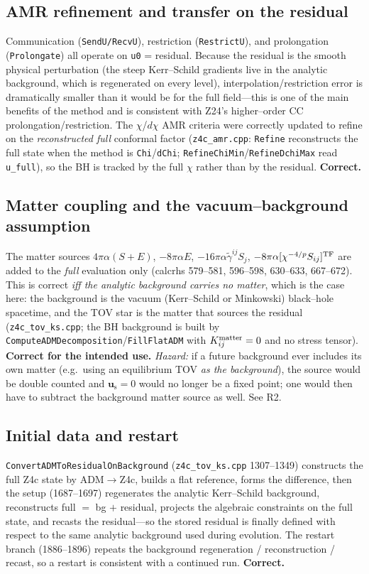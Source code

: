 \documentclass[11pt]{article}
\newcommand{\code}[1]{\texttt{#1}}
\newcommand{\file}[1]{\texttt{#1}}
\newcommand{\gt}{\tilde\gamma}
\newcommand{\res}[1]{#1_{\mathrm s}}
\begin{document}
\subsection{AMR refinement and transfer on the residual}
\label{sec:amr}
Communication (\code{SendU/RecvU}), restriction (\code{RestrictU}), and
prolongation (\code{Prolongate}) all operate on \code{u0} = residual. Because
the residual is the smooth physical perturbation (the steep Kerr--Schild
gradients live in the analytic background, which is regenerated on every
level), interpolation/restriction error is dramatically smaller than it would
be for the full field---this is one of the main benefits of the method and is
consistent with Z24's higher--order CC prolongation/restriction. The
$\chi$/$d\chi$ AMR criteria were correctly updated to refine on the
\emph{reconstructed full} conformal factor (\file{z4c\_amr.cpp}: \code{Refine}
reconstructs the full state when the method is \code{Chi}/\code{dChi};
\code{RefineChiMin}/\code{RefineDchiMax} read \code{u\_full}), so the BH is
tracked by the full $\chi$ rather than by the residual. \textbf{Correct.}

\subsection{Matter coupling and the vacuum--background assumption}
\label{sec:matter}
The matter sources $4\pi\alpha(S+E)$, $-8\pi\alpha E$, $-16\pi\alpha\gt^{ij}S_j$,
$-8\pi\alpha[\chi^{-4/p}S_{ij}]^{\rm TF}$ are added to the \emph{full}
evaluation only (calcrhs 579--581, 596--598, 630--633, 667--672). This is
correct \emph{iff the analytic background carries no matter}, which is the case
here: the background is the vacuum (Kerr--Schild or Minkowski) black--hole
spacetime, and the TOV star is the matter that sources the residual
(\file{z4c\_tov\_ks.cpp}; the BH background is built by
\code{ComputeADMDecomposition}/\code{FillFlatADM} with $K^{\rm
matter}_{ij}=0$ and no stress tensor). \textbf{Correct for the intended use.}
\emph{Hazard:} if a future background ever includes its own matter (e.g.\ using
an equilibrium TOV \emph{as the background}), the source would be double
counted and $\res{\bm u}=0$ would no longer be a fixed point; one would then
have to subtract the background matter source as well. See R2.

\subsection{Initial data and restart}
\code{ConvertADMToResidualOnBackground} (\file{z4c\_tov\_ks.cpp} 1307--1349)
constructs the full Z4c state by ADM$\to$Z4c, builds a flat reference, forms
the difference, then the setup (1687--1697) regenerates the analytic
Kerr--Schild background, reconstructs full $=$ bg $+$ residual, projects the
algebraic constraints on the full state, and recasts the residual---so the
stored residual is finally defined with respect to the same analytic
background used during evolution. The restart branch (1886--1896) repeats the
background regeneration / reconstruction / recast, so a restart is consistent
with a continued run. \textbf{Correct.}
\end{document}
